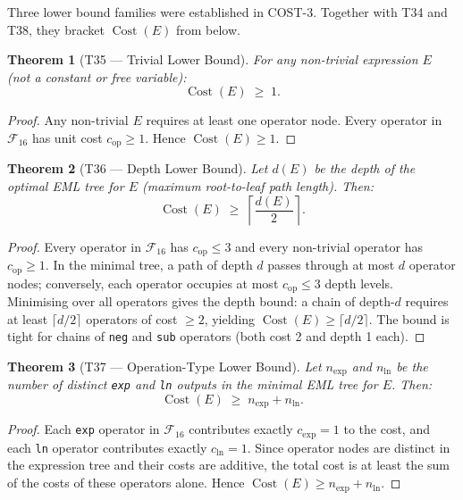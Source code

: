 \documentclass[12pt,a4paper]{article}
\newtheorem{theorem}{Theorem}[section]
\theoremstyle{definition}
\newcommand{\Cost}{\operatorname{Cost}}
\begin{document}
Three lower bound families were established in COST-3.  Together with T34 and
T38, they bracket $\Cost(E)$ from below.

\begin{theorem}[T35 --- Trivial Lower Bound]
\label{thm:T35}
For any non-trivial expression $E$ (not a constant or free variable):
\[
  \Cost(E) \;\geq\; 1.
\]
\end{theorem}

\begin{proof}
Any non-trivial $E$ requires at least one operator node.  Every operator in
$\mathcal{F}_{16}$ has unit cost $c_{\mathrm{op}} \geq 1$.  Hence
$\Cost(E) \geq 1$.
\end{proof}

\begin{theorem}[T36 --- Depth Lower Bound]
\label{thm:T36}
Let $d(E)$ be the depth of the optimal EML tree for $E$ (maximum root-to-leaf
path length).  Then:
\[
  \Cost(E) \;\geq\; \left\lceil \frac{d(E)}{2} \right\rceil.
\]
\end{theorem}

\begin{proof}
Every operator in $\mathcal{F}_{16}$ has $c_{\mathrm{op}} \leq 3$ and every
non-trivial operator has $c_{\mathrm{op}} \geq 1$.  In the minimal tree, a
path of depth $d$ passes through at most $d$ operator nodes; conversely, each
operator occupies at most $c_{\mathrm{op}} \leq 3$ depth levels.  Minimising
over all operators gives the depth bound: a chain of depth-$d$ requires at
least $\lceil d/2 \rceil$ operators of cost $\geq 2$, yielding
$\Cost(E) \geq \lceil d/2 \rceil$.  The bound is tight for chains of
\texttt{neg} and \texttt{sub} operators (both cost 2 and depth 1 each).
\end{proof}

\begin{theorem}[T37 --- Operation-Type Lower Bound]
\label{thm:T37}
Let $n_{\exp}$ and $n_{\ln}$ be the number of distinct \texttt{exp} and
\texttt{ln} outputs in the minimal EML tree for $E$.  Then:
\[
  \Cost(E) \;\geq\; n_{\exp} + n_{\ln}.
\]
\end{theorem}

\begin{proof}
Each \texttt{exp} operator in $\mathcal{F}_{16}$ contributes exactly
$c_{\exp} = 1$ to the cost, and each \texttt{ln} operator contributes exactly
$c_{\ln} = 1$.  Since operator nodes are distinct in the expression tree and
their costs are additive, the total cost is at least the sum of the costs of
these operators alone.  Hence $\Cost(E) \geq n_{\exp} + n_{\ln}$.
\end{proof}
\end{document}
